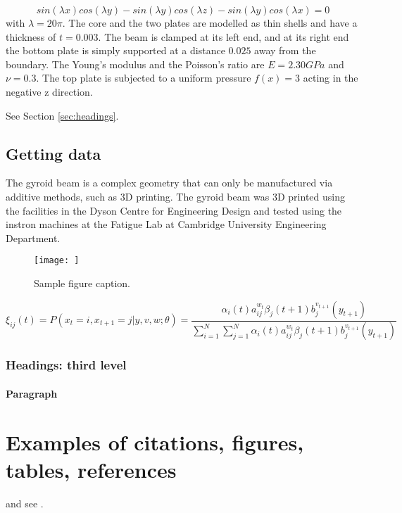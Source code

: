 \documentclass{article}
\begin{document}
\begin{equation}
sin(\lambda x) cos(\lambda y) - sin(\lambda y) cos(\lambda z) - sin(\lambda y) cos(\lambda x) = 0
\end{equation}
with $\lambda = 20\pi$. The core and the two plates are modelled as thin shells and have a thickness of $t = 0.003$.
The beam is clamped at its left end, and at its right end the bottom plate is simply supported at a
distance $0.025$ away from the boundary. The Young’s modulus and the Poisson’s ratio are $E = 2.30GPa$
and $\nu = 0.3$. The top plate is subjected to a uniform pressure $f(x) = 3$ acting in the negative z
direction.


\lipsum[4] See Section \ref{sec:headings}.

\subsection{Getting data}
The gyroid beam is a complex geometry that can only be manufactured via additive methods, such as 3D printing. The gyroid beam was 3D printed using the facilities in the Dyson Centre for Engineering Design and tested using the instron machines at the Fatigue Lab at Cambridge University Engineering Department.\\

\begin{figure}
	\centering
	\fbox{\rule[-.5cm]{4cm}{4cm} \rule[-.5cm]{4cm}{0cm}}
	\texttt{[image: ]}
	\caption{Sample figure caption.}
	\label{fig:fig1}
\end{figure}






\begin{equation}
\xi _{ij}(t)=P(x_{t}=i,x_{t+1}=j|y,v,w;\theta)= {\frac {\alpha _{i}(t)a^{w_t}_{ij}\beta _{j}(t+1)b^{v_{t+1}}_{j}(y_{t+1})}{\sum _{i=1}^{N} \sum _{j=1}^{N} \alpha _{i}(t)a^{w_t}_{ij}\beta _{j}(t+1)b^{v_{t+1}}_{j}(y_{t+1})}}
\end{equation}

\subsubsection{Headings: third level}
\lipsum[6]

\paragraph{Paragraph}
\lipsum[7]

\section{Examples of citations, figures, tables, references}
\label{sec:others}
\lipsum[8] \cite{kour2014real,kour2014fast} and see \cite{hadash2018estimate}.
\end{document}
